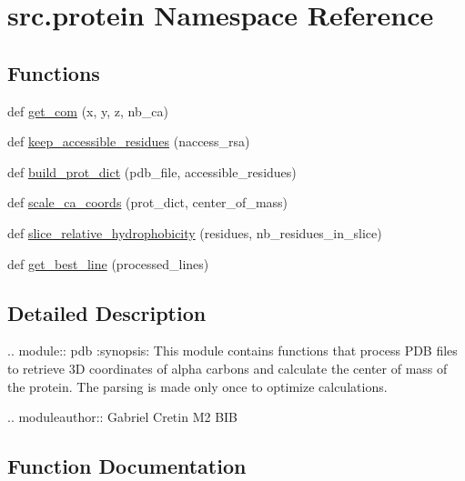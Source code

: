 \hypertarget{namespacesrc_1_1protein}{}\section{src.\+protein Namespace Reference}
\label{namespacesrc_1_1protein}
\subsection*{Functions}
\begin{DoxyCompactItemize}
\item 
def \hyperlink{namespacesrc_1_1protein_a189ed925ce20fd17bb6f5ac631acaf89}{get\+\_\+com} (x, y, z, nb\+\_\+ca)
\item 
def \hyperlink{namespacesrc_1_1protein_a61ac829ce9a95bc584eb90e83b8463c9}{keep\+\_\+accessible\+\_\+residues} (naccess\+\_\+rsa)
\item 
def \hyperlink{namespacesrc_1_1protein_ae1e7914a2f8596e28dd22afc4f22bab7}{build\+\_\+prot\+\_\+dict} (pdb\+\_\+file, accessible\+\_\+residues)
\item 
def \hyperlink{namespacesrc_1_1protein_a2f9c9ce10ad76c74e869f4cc0838d6b8}{scale\+\_\+ca\+\_\+coords} (prot\+\_\+dict, center\+\_\+of\+\_\+mass)
\item 
def \hyperlink{namespacesrc_1_1protein_a18d36b5a363ac29227c8cd0828c208bb}{slice\+\_\+relative\+\_\+hydrophobicity} (residues, nb\+\_\+residues\+\_\+in\+\_\+slice)
\item 
def \hyperlink{namespacesrc_1_1protein_a8c066a47c369571e989b856d97bcb735}{get\+\_\+best\+\_\+line} (processed\+\_\+lines)
\end{DoxyCompactItemize}


\subsection{Detailed Description}
\begin{DoxyVerb}.. module:: pdb
   :synopsis: This module contains functions that process PDB files to retrieve
   3D coordinates of alpha carbons and calculate the center of mass of the protein.
   The parsing is made only once to optimize calculations.

.. moduleauthor:: Gabriel Cretin M2 BIB
\end{DoxyVerb}
 

\subsection{Function Documentation}
\mbox{\label{namespacesrc_1_1protein_ae1e7914a2f8596e28dd22afc4f22bab7}} 
